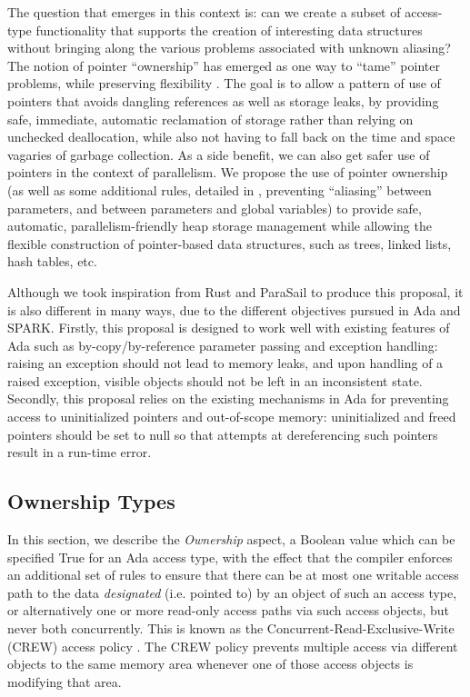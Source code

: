 \documentclass{llncs}
\begin{document}
The question that emerges in this context is: can we create a subset of access-type functionality that supports the creation of interesting data structures without bringing along
the various problems associated with unknown aliasing? The notion of pointer ``ownership'' has emerged as one way to ``tame'' pointer problems, while preserving flexibility \cite{POM}.  The goal is to allow a pattern of use
of pointers that avoids dangling references as well as storage leaks, by providing safe, immediate, automatic reclamation of storage rather than relying on unchecked deallocation,
while also not having to fall back on the time and space vagaries of garbage collection.  As a side benefit, we can also get safer use of pointers in the context of parallelism.
We propose the use of pointer ownership (as well as some additional rules, detailed in \cite{AI2018}, preventing ``aliasing'' between parameters, and between parameters and global variables) to provide safe,
automatic, parallelism-friendly heap storage management while allowing the flexible construction of pointer-based data structures, such as trees, linked lists, hash tables, etc.

Although we took inspiration from Rust and ParaSail to produce this proposal, it is also different in many ways, due to the different objectives pursued in Ada and SPARK. Firstly,
this proposal is designed to work well with existing features of Ada such as by-copy/by-reference parameter passing and exception handling: raising an exception should not lead to
memory leaks, and upon handling of a raised exception, visible objects should not be left in an inconsistent state. Secondly, this proposal relies on the existing mechanisms in Ada
for preventing access to uninitialized pointers and out-of-scope memory: uninitialized and freed pointers should be set to null so that attempts at dereferencing such pointers result in a run-time error.


\subsection{Ownership Types}
\label{sec:ownership}

In this section, we describe the \textit{Ownership} aspect, a Boolean value which can be specified True for an Ada access type, with the effect that the compiler enforces an additional set of rules to ensure that there can be at most one writable access path to the data
\textit{designated} (i.e. pointed to) by an object of such an access type, or alternatively one or more read-only access paths via such access objects, but never both concurrently. This is known as
the Concurrent-Read-Exclusive-Write (CREW) access policy \cite{CREW}. The CREW policy prevents multiple access via different objects to the same memory area whenever one
of those access objects is modifying that area.
\end{document}

